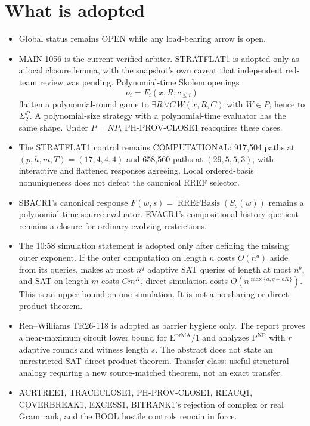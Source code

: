 \documentclass[11pt]{article}
\begin{document}
\section*{What is adopted}
\begin{itemize}
\item Global status remains OPEN while any load-bearing arrow is open.
\item MAIN 1056 is the current verified arbiter. STRATFLAT1 is adopted only as a
local closure lemma, with the snapshot's own caveat that independent red-team review
was pending. Polynomial-time Skolem openings
\[
o_i=F_i(x,R,c_{\le i})
\]
flatten a polynomial-round game to \(\exists R\,\forall C\,W(x,R,C)\) with \(W\in P\),
hence to \(\Sigma_2^P\). A polynomial-size strategy with a polynomial-time evaluator
has the same shape. Under \(P=NP\), PH-PROV-CLOSE1 reacquires these cases.
\item The STRATFLAT1 control remains COMPUTATIONAL: 917{,}504 paths at
\((p,h,m,T)=(17,4,4,4)\) and 658{,}560 paths at \((29,5,5,3)\), with interactive and
flattened responses agreeing. Local ordered-basis nonuniqueness does not defeat the
canonical RREF selector.
\item SBACR1's canonical response \(F(w,s)=\operatorname{RREFBasis}(S_s(w))\) remains a
polynomial-time source evaluator. EVACR1's compositional history quotient remains a
closure for ordinary evolving restrictions.
\item The 10:58 simulation statement is adopted only after defining the missing outer
exponent. If the outer computation on length \(n\) costs \(O(n^a)\) aside from its
queries, makes at most \(n^q\) adaptive SAT queries of length at most \(n^b\), and SAT
on length \(m\) costs \(Cm^K\), direct simulation costs
\(O(n^{\max\{a,q+bK\}})\). This is an upper bound on one simulation. It is not a
no-sharing or direct-product theorem.
\item Ren--Williams TR26-118 is adopted as barrier hygiene only. The report proves a
near-maximum circuit lower bound for \(\mathrm{E}^{\mathrm{prMA}}/1\) and analyzes
\(\mathrm{P}^{\mathrm{NP}}\) with \(r\) adaptive rounds and witness length \(s\).
The abstract does not state an unrestricted SAT direct-product theorem. Transfer class:
useful structural analogy requiring a new source-matched theorem, not an exact transfer.
\item ACRTREE1, TRACECLOSE1, PH-PROV-CLOSE1, REACQ1, COVERBREAK1, EXCESS1, BITRANK1's
rejection of complex or real Gram rank, and the BOOL hostile controls remain in force.
\end{itemize}
\end{document}
